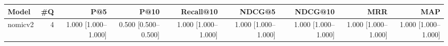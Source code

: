 \begin{tabular}{lrrrrrrrr}
\toprule
Model & \#Q & P@5 & P@10 & Recall@10 & NDCG@5 & NDCG@10 & MRR & MAP \\
\midrule
nomicv2 & 4 & 1.000 [1.000–1.000] & 0.500 [0.500–0.500] & 1.000 [1.000–1.000] & 1.000 [1.000–1.000] & 1.000 [1.000–1.000] & 1.000 [1.000–1.000] & 1.000 [1.000–1.000] \\
\bottomrule
\end{tabular}
